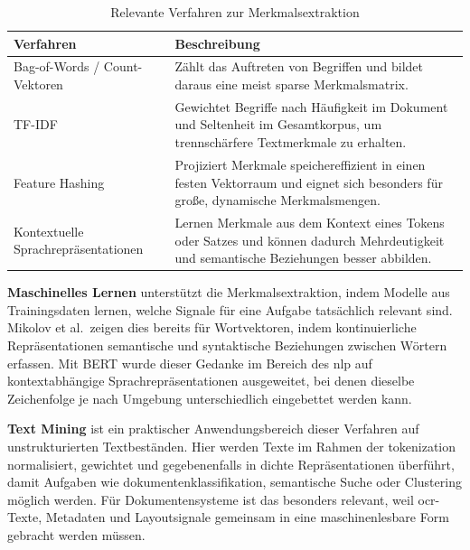 \begin{table}[h]
\centering
\caption{Relevante Verfahren zur Merkmalsextraktion \cite{sklearn_feature_extraction,stanford_tfidf,bert_2019}}
\label{tab:Algorithmen}
\begin{tabular}{p{4cm} p{10cm}}
\textbf{Verfahren} & \textbf{Beschreibung} \\ \hline

Bag-of-Words / Count-Vektoren &
Zählt das Auftreten von Begriffen und bildet daraus eine meist sparse Merkmalsmatrix. \\\hline

TF-IDF &
Gewichtet Begriffe nach Häufigkeit im Dokument und Seltenheit im Gesamtkorpus, um trennschärfere Textmerkmale zu erhalten.  \\\hline

Feature Hashing &
Projiziert Merkmale speichereffizient in einen festen Vektorraum und eignet sich besonders für große, dynamische Merkmalsmengen. \\ \hline

Kontextuelle Sprachrepräsentationen &
Lernen Merkmale aus dem Kontext eines Tokens oder Satzes und können dadurch Mehrdeutigkeit und semantische Beziehungen besser abbilden. \\ \hline


\end{tabular}
\end{table}
\newpage

\textbf{Maschinelles Lernen} unterstützt die Merkmalsextraktion, indem Modelle aus Trainingsdaten lernen, welche Signale für eine Aufgabe tatsächlich relevant sind. Mikolov et al.\ zeigen dies bereits für Wortvektoren, indem kontinuierliche Repräsentationen semantische und syntaktische Beziehungen zwischen Wörtern erfassen. Mit BERT wurde dieser Gedanke im Bereich des \acrshort{nlp} auf kontextabhängige Sprachrepräsentationen ausgeweitet, bei denen dieselbe Zeichenfolge je nach Umgebung unterschiedlich eingebettet werden kann. \cite{mikolov2013word2vec,bert_2019}

\textbf{Text Mining} ist ein praktischer Anwendungsbereich dieser Verfahren auf unstrukturierten Textbeständen. Hier werden Texte im Rahmen der \gls{tokenization} normalisiert, gewichtet und gegebenenfalls in dichte Repräsentationen überführt, damit Aufgaben wie \gls{dokumentenklassifikation}, semantische Suche oder Clustering möglich werden. Für Dokumentensysteme ist das besonders relevant, weil \acrshort{ocr}-Texte, Metadaten und Layoutsignale gemeinsam in eine maschinenlesbare Form gebracht werden müssen. \cite{manning2008irbook,sklearn_feature_extraction,layoutlm_2020}

